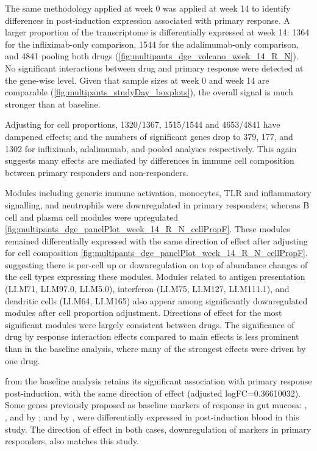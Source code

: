 \begin{outline}
The same methodology applied at week 0 was applied at week 14 to identify differences in post-induction expression associated with primary response.
A larger proportion of the transcriptome is differentially expressed at week 14: 
1364 for the infliximab-only comparison, 
1544 for the adalimumab-only comparison, 
and 4841 pooling both drugs (\autoref{fig:multipants_dge_volcano_week_14_R_N}).
No significant interactions between drug and primary response were detected at the gene-wise level.
Given that sample sizes at week 0 and week 14 are comparable (\autoref{fig:multipants_studyDay_boxplots}), the overall signal is much stronger than at baseline.

Adjusting for cell proportions, 1320/1367, 1515/1544 and 4653/4841 have dampened effects;
and the numbers of significant genes drop to 379, 177, and 1302 for infliximab, adalimumab, and pooled analyses respectively.
This again suggests many effects are mediated by differences in immune cell composition between primary responders and non-responders.

Modules including generic immune activation, monocytes, TLR and inflammatory signalling, and neutrophils were downregulated in primary responders; 
whereas B cell and plasma cell modules were upregulated \autoref{fig:multipants_dge_panelPlot_week_14_R_N_cellPropF}.
These modules remained differentially expressed with the same direction of effect after adjusting for cell composition \autoref{fig:multipants_dge_panelPlot_week_14_R_N_cellPropF}, 
suggesting there is per-cell up or downregulation on top of abundance changes of the cell types expressing these modules.
Modules related to antigen presentation (LI.M71, LI.M97.0, LI.M5.0),
interferon (LI.M75, LI.M127, LI.M111.1),
and dendritic cells (LI.M64, LI.M165)
also appear among significantly downregulated modules after cell proportion adjustment.
Directions of effect for the most significant modules were largely consistent between drugs.
The significance of drug by response interaction effects compared to main effects is less prominent 
than in the baseline analysis, where many of the strongest effects were driven by one drug.

 from the baseline analysis retains its significant association with primary response post-induction, 
with the same direction of effect (adjusted logFC=\num{0.36610032}).
Some genes previously proposed as baseline markers of response in gut mucosa: , ,  and  by \autocite{arijs2010PredictiveValueEpithelial}; and  by \autocite{west2017OncostatinDrivesIntestinal},
were differentially expressed in post-induction blood in this study.
The direction of effect in both cases, downregulation of markers in primary responders, also matches this study.


\end{outline}
